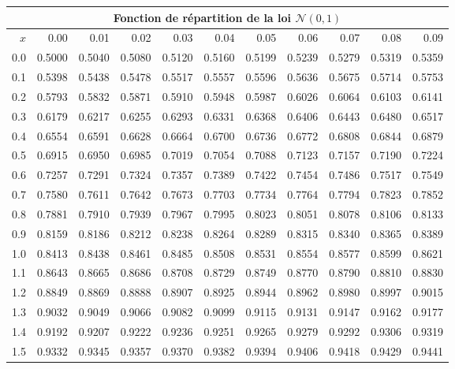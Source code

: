 \begin{center}
    \renewcommand{\arraystretch}{1.05}
    \setlength{\tabcolsep}{5pt}
    \begin{tabular}{|r|r@{\ }r@{\ }r@{\ }r@{\ }r@{\ }r@{\ }r@{\ }r@{\ }r@{\ }r@{\ }|}
    \hline
    \multicolumn{11}{|c|}{ Fonction de répartition de la loi $\mathcal{N}(0,1)$}\\
    \hline
    \hline
    $x$&0.00&0.01&0.02&0.03&0.04&0.05&0.06&0.07&0.08&0.09\\
    \hline
    0.0&0.5000&0.5040&0.5080&0.5120&0.5160&0.5199&0.5239&0.5279&0.5319&0.5359\\
    \hline
    0.1&0.5398&0.5438&0.5478&0.5517&0.5557&0.5596&0.5636&0.5675&0.5714&0.5753\\
    \hline
    0.2&0.5793&0.5832&0.5871&0.5910&0.5948&0.5987&0.6026&0.6064&0.6103&0.6141\\
    \hline
    0.3&0.6179&0.6217&0.6255&0.6293&0.6331&0.6368&0.6406&0.6443&0.6480&0.6517\\
    \hline
    0.4&0.6554&0.6591&0.6628&0.6664&0.6700&0.6736&0.6772&0.6808&0.6844&0.6879\\
    \hline
    0.5&0.6915&0.6950&0.6985&0.7019&0.7054&0.7088&0.7123&0.7157&0.7190&0.7224\\
    \hline
    0.6&0.7257&0.7291&0.7324&0.7357&0.7389&0.7422&0.7454&0.7486&0.7517&0.7549\\
    \hline
    0.7&0.7580&0.7611&0.7642&0.7673&0.7703&0.7734&0.7764&0.7794&0.7823&0.7852\\
    \hline
    0.8&0.7881&0.7910&0.7939&0.7967&0.7995&0.8023&0.8051&0.8078&0.8106&0.8133\\
    \hline
    0.9&0.8159&0.8186&0.8212&0.8238&0.8264&0.8289&0.8315&0.8340&0.8365&0.8389\\
    \hline
    1.0&0.8413&0.8438&0.8461&0.8485&0.8508&0.8531&0.8554&0.8577&0.8599&0.8621\\
    \hline
    1.1&0.8643&0.8665&0.8686&0.8708&0.8729&0.8749&0.8770&0.8790&0.8810&0.8830\\
    \hline
    1.2&0.8849&0.8869&0.8888&0.8907&0.8925&0.8944&0.8962&0.8980&0.8997&0.9015\\
    \hline
    1.3&0.9032&0.9049&0.9066&0.9082&0.9099&0.9115&0.9131&0.9147&0.9162&0.9177\\
    \hline
    1.4&0.9192&0.9207&0.9222&0.9236&0.9251&0.9265&0.9279&0.9292&0.9306&0.9319\\
    \hline
    1.5&0.9332&0.9345&0.9357&0.9370&0.9382&0.9394&0.9406&0.9418&0.9429&0.9441\\

\end{tabular}
\end{center}
